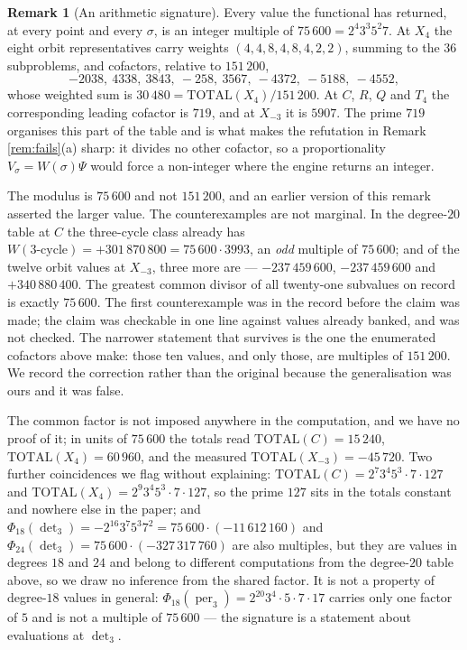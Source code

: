 \documentclass[11pt,reqno]{amsart}
\theoremstyle{plain}
\theoremstyle{definition}
\newtheorem{remark}[theorem]{Remark}
\DeclareMathOperator{\per}{per}
\begin{document}
\begin{remark}[An arithmetic signature]\label{rem:arith}
Every value the functional has returned, at every point and every $\sigma$, is
an integer multiple of $75\,600=2^{4}3^{3}5^{2}7$.  At $X_4$ the eight orbit
representatives carry weights $(4,4,8,4,8,4,2,2)$, summing to the $36$
subproblems, and cofactors, relative to $151\,200$,
\[
  -2038,\ 4338,\ 3843,\ -258,\ 3567,\ -4372,\ -5188,\ -4552 ,
\]
whose weighted sum is $30\,480=\mathrm{TOTAL}(X_4)/151\,200$.  At $C$, $R$, $Q$
and $T_4$ the corresponding leading cofactor is $719$, and at $X_{-3}$ it is
$5907$.  The prime $719$ organises this part of the table and is what makes the
refutation in Remark \ref{rem:fails}(a) sharp: it divides no other cofactor, so
a proportionality $V_\sigma=W(\sigma)\Psi$ would force a non-integer where the
engine returns an integer.

The modulus is $75\,600$ and not $151\,200$, and an earlier version of this
remark asserted the larger value.  The counterexamples are not marginal.  In
the degree-$20$ table at $C$ the three-cycle class already has
$W(\text{3-cycle})=+301\,870\,800=75\,600\cdot3993$, an \emph{odd} multiple of
$75\,600$; and of the twelve orbit values at $X_{-3}$, three more are
--- $-237\,459\,600$, $-237\,459\,600$ and $+340\,880\,400$.  The greatest
common divisor of all twenty-one subvalues on record is exactly $75\,600$.
The first counterexample was in the record before the claim was made; the
claim was checkable in one line against values already banked, and was not
checked.  The
narrower statement that survives is the one the enumerated cofactors above make:
those ten values, and only those, are multiples of $151\,200$.  We record the
correction rather than the original because the generalisation was ours and it
was false.

The common factor is not imposed anywhere in the computation, and we have no
proof of it; in units of $75\,600$ the totals read
$\mathrm{TOTAL}(C)=15\,240$, $\mathrm{TOTAL}(X_4)=60\,960$, and the
measured $\mathrm{TOTAL}(X_{-3})=-45\,720$.  Two further coincidences we
flag without explaining:
$\mathrm{TOTAL}(C)=2^{7}3^{4}5^{3}\cdot7\cdot127$ and
$\mathrm{TOTAL}(X_4)=2^{9}3^{4}5^{3}\cdot7\cdot127$, so the prime $127$ sits in
the totals constant and nowhere else in the paper; and
$\Phi_{18}(\det_3)=-2^{16}3^{7}5^{3}7^{2}=75\,600\cdot(-11\,612\,160)$ and
$\Phi_{24}(\det_3)=75\,600\cdot(-327\,317\,760)$ are also multiples, but they
are values in degrees $18$ and $24$ and belong to different computations from
the degree-$20$ table above, so we draw no inference from the shared factor.
It is not a property of degree-$18$ values in general:
$\Phi_{18}(\per_3)=2^{20}3^{4}\cdot5\cdot7\cdot17$ carries only one factor of
$5$ and is not a multiple of $75\,600$ --- the signature is a statement about
evaluations at $\det_3$.
\end{remark}
\end{document}
